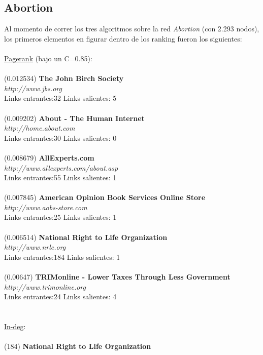 \documentclass[a4paper]{article}
\begin{document}
\subsection*{Abortion}
\indent Al momento de correr los tres algoritmos sobre la red \emph{Abortion} (con 2.293 nodos), los primeros elementos en figurar dentro de los ranking fueron los siguientes: \\
\\
\underline{Pagerank} (bajo un C=0.85): \\
\\
(0.012534) \textbf{The John Birch Society} \\
\textit{http://www.jbs.org} \\
Links entrantes:32 \indent Links salientes: 5\\
\\
(0.009202) \textbf{About - The Human Internet} \\
\textit{http://home.about.com} \\
Links entrantes:30 \indent Links salientes: 0\\
\\
(0.008679)\textbf{ AllExperts.com }\\
\textit{http://www.allexperts.com/about.asp} \\
Links entrantes:55 \indent Links salientes: 1\\
\\
(0.007845) \textbf{American Opinion Book Services Online Store }\\
\textit{http://www.aobs-store.com} \\
Links entrantes:25 \indent Links salientes: 1\\
\\
(0.006514) \textbf{National Right to Life Organization} \\
\textit{http://www.nrlc.org} \\
Links entrantes:184 \indent Links salientes: 1\\
\\
(0.00647) \textbf{TRIMonline - Lower Taxes Through Less Government} \\
\textit{http://www.trimonline.org} \\
Links entrantes:24 \indent Links salientes: 4\\
\\
\\
\underline{In-deg}:\\
\\
(184) \textbf{National Right to Life Organization} \\
\end{document}
